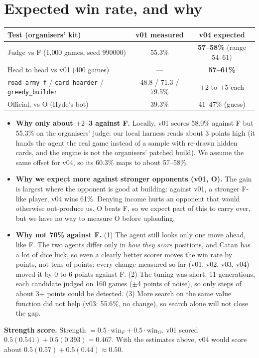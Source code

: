 \documentclass[11pt]{article}
\begin{document}
\section{Expected win rate, and why}\label{sec:expect}
\begin{center}
\begin{tabular}{lcc}
\toprule
Test (organisers' kit) & v01 measured & v04 expected \\
\midrule
Judge vs F (1{,}000 games, seed 990000) & 55.3\% & \textbf{57--58\%} (range 54--61) \\
Head to head vs v01 (400 games) & --- & \textbf{57--61\%} \\
\texttt{road\_army\_f} / \texttt{card\_hoarder} / \texttt{greedy\_builder} & 48.8 / 71.3 / 79.5\% & $+2$ to $+5$ each \\
Official, vs O (Hyde's bot) & 39.3\% & 41--47\% (guess)  \\
\bottomrule
\end{tabular}
\end{center}
\begin{itemize}
  \item \textbf{Why only about $+2$--3 against F.} Locally, v01 scores 58.0\% against F but 55.3\% on
    the organisers' judge: our local harness reads about 3 points high (it hands the agent the real
    game instead of a sample with re-drawn hidden cards, and the engine is not the organisers'
    patched build). We assume the same offset for v04, so its 60.3\% maps to about 57--58\%.
  \item \textbf{Why we expect more against stronger opponents (v01, O).} The gain is largest where the
    opponent is good at building: against v01, a stronger F-like player, v04 wins 61\%. Denying
    income hurts an opponent that would otherwise out-produce us. O beats F, so we expect part of
    this to carry over, but we have no way to measure O before uploading.
  \item \textbf{Why not 70\% against F.} (1) The agent still looks only one move ahead, like F. The
    two agents differ only in \emph{how they score} positions, and Catan has a lot of dice luck,
    so even a clearly better scorer moves the win rate by points, not tens of points: every
    change measured so far (v01, v02, v03, v04) moved it by 0 to 6 points against F. (2) The tuning was short: 11 generations, each candidate judged on 160 games
    ($\pm$4 points of noise), so only steps of about 3+ points could be detected. (3) More search
    on the same value function did not help (v03: 55.6\%, no change), so search alone will not
    close the gap.
\end{itemize}
\textbf{Strength score.} Strength $=0.5\cdot\text{win}_F + 0.5\cdot\text{win}_O$. v01 scored
$0.5(0.541)+0.5(0.393)=0.467$. With the estimates above, v04 would score about
$0.5(0.57)+0.5(0.44)\approx 0.50$.
\end{document}
